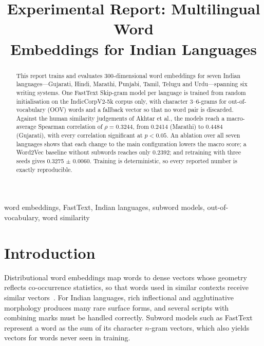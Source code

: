 \documentclass[conference,10pt]{IEEEtran}
\begin{document}
\title{Experimental Report: Multilingual Word\\ Embeddings for Indian Languages}

\author{
}

\maketitle

\begin{abstract}
This report trains and evaluates 300-dimensional word embeddings for seven Indian languages---Gujarati, Hindi, Marathi, Punjabi, Tamil, Telugu and Urdu---spanning six writing systems. One FastText Skip-gram model per language is trained from random initialisation on the IndicCorpV2-5k corpus only, with character 3--6-grams for out-of-vocabulary (OOV) words and a fallback vector so that no word pair is discarded. Against the human similarity judgements of Akhtar et al., the models reach a macro-average Spearman correlation of $\rho = 0.3244$, from 0.2414 (Marathi) to 0.4484 (Gujarati), with every correlation significant at $p < 0.05$. An ablation over all seven languages shows that each change to the main configuration lowers the macro score; a Word2Vec baseline without subwords reaches only 0.2392; and retraining with three seeds gives 0.3275 $\pm$ 0.0060. Training is deterministic, so every reported number is exactly reproducible.
\end{abstract}

\begin{IEEEkeywords}
word embeddings, FastText, Indian languages, subword models, out-of-vocabulary, word similarity
\end{IEEEkeywords}

\section{Introduction}
Distributional word embeddings map words to dense vectors whose geometry reflects co-occurrence statistics, so that words used in similar contexts receive similar vectors~\cite{mikolov2013}. For Indian languages, rich inflectional and agglutinative morphology produces many rare surface forms, and several scripts with combining marks must be handled correctly. Subword models such as FastText~\cite{bojanowski2017} represent a word as the sum of its character $n$-gram vectors, which also yields vectors for words never seen in training.
\end{document}
